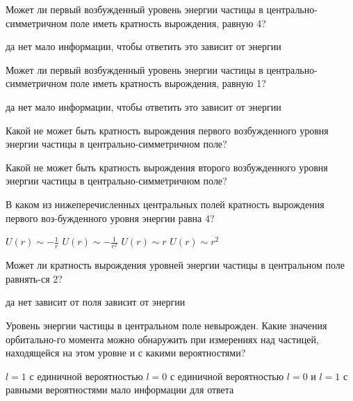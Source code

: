 \documentclass[11pt,a4paper]{exam}
\begin{document}
\begin{questions}
\question Может ли первый возбужденный уровень энергии частицы в центрально-симметричном поле иметь кратность вырождения, равную 4?
\begin{choices}
\choice да    
\choice нет      
\choice мало информации, чтобы ответить  
\choice это зависит от энергии
\end{choices}

\question Может ли первый возбужденный уровень энергии частицы в центрально-симметричном поле иметь кратность вырождения, равную 1?
\begin{choices}
\choice да    
\choice нет      
\choice мало информации, чтобы ответить  
\choice это зависит от энергии
\end{choices}

\question Какой не может быть кратность вырождения первого возбужденного уровня энергии частицы в центрально-симметричном поле?
\begin{choices}
\end{choices}

\question Какой не может быть кратность вырождения второго возбужденного уровня энергии частицы в центрально-симметричном поле?
\begin{choices}
\end{choices}

\question В каком из нижеперечисленных центральных полей кратность вырождения первого воз-бужденного уровня энергии равна 4?
\begin{choices}
\choice $U(r) \sim  - \frac{1}{r}$    
\choice $U(r) \sim  - \frac{1}{{{r^2}}}$ 
\choice $U(r) \sim r$     
\choice $U(r) \sim {r^2}$
\end{choices}

\question Может ли кратность вырождения уровней энергии частицы в центральном поле равнять-ся 2?
\begin{choices}
\choice да    
\choice нет      
\choice зависит от поля      
\choice зависит от энергии
\end{choices}

\question Уровень энергии частицы в центральном поле невырожден. Какие значения орбитально-го момента можно обнаружить при измерениях над частицей, находящейся на этом уровне и с какими вероятностями?
\begin{choices}
\choice $l = 1$ с единичной вероятностью       
\choice $l = 0$ с единичной вероятностью
\choice $l = 0$ и $l = 1$ с равными вероятностями    
\choice мало информации для ответа 
\end{choices}


\end{questions}
\end{document}
